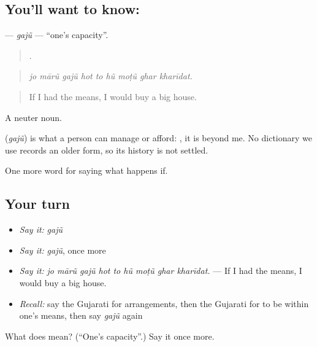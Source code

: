 \subsection*{You'll want to know: }
\textbf{} — \emph{gajũ} — \textquotedblleft{}one's capacity\textquotedblright{}.

\begin{quote}
        .
\end{quote}

\begin{quote}
\emph{jo mārũ gajũ hot to hũ moṭũ ghar kharīdat.}
\end{quote}

\begin{quote}
If I had the means, I would buy a big house.
\end{quote}

A neuter noun.

\begin{cousinweb}
\textbf{} (\emph{gajũ}) is what a person can manage or afford: \textbf{  }, it is beyond me. No dictionary we use records an older form, so its history is not settled.
\end{cousinweb}

\begin{grammarlens}[title={What you've built}]
One more word for saying what happens if.
\end{grammarlens}

\subsection*{Your turn}
\begin{itemize}
\raggedright
  \item \emph{Say it:} \emph{gajũ}
  \item \emph{Say it:} \emph{gajũ}, once more
  \item \emph{Say it:} \emph{jo mārũ gajũ hot to hũ moṭũ ghar kharīdat.} — If I had the means, I would buy a big house.
  \item \emph{Recall:} say the Gujarati for arrangements, then the Gujarati for to be within one's means, then say \emph{gajũ} again
\end{itemize}

\begin{tcolorbox}[breakable,colback=teal!4,colframe=teal!35!black,title={Before you move on}]
What does  mean? (\textquotedblleft{}One's capacity\textquotedblright{}.) Say it once more.
\end{tcolorbox}
